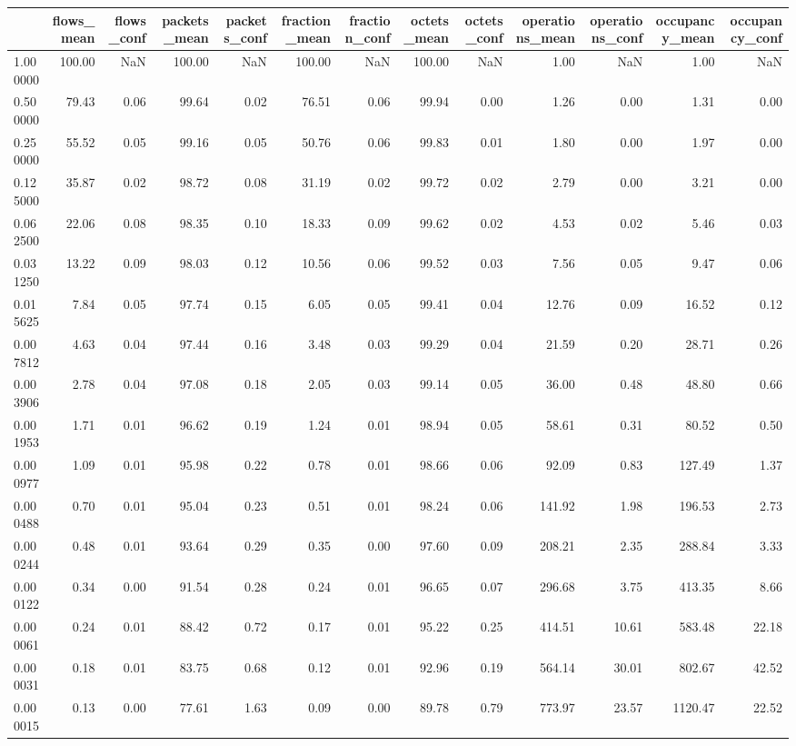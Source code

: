 \begin{tabular}{lrrrrrrrrrrrr}
\toprule
 & flows_mean & flows_conf & packets_mean & packets_conf & fraction_mean & fraction_conf & octets_mean & octets_conf & operations_mean & operations_conf & occupancy_mean & occupancy_conf \\
\midrule
1.000000 & 100.00 & NaN & 100.00 & NaN & 100.00 & NaN & 100.00 & NaN & 1.00 & NaN & 1.00 & NaN \\
0.500000 & 79.43 & 0.06 & 99.64 & 0.02 & 76.51 & 0.06 & 99.94 & 0.00 & 1.26 & 0.00 & 1.31 & 0.00 \\
0.250000 & 55.52 & 0.05 & 99.16 & 0.05 & 50.76 & 0.06 & 99.83 & 0.01 & 1.80 & 0.00 & 1.97 & 0.00 \\
0.125000 & 35.87 & 0.02 & 98.72 & 0.08 & 31.19 & 0.02 & 99.72 & 0.02 & 2.79 & 0.00 & 3.21 & 0.00 \\
0.062500 & 22.06 & 0.08 & 98.35 & 0.10 & 18.33 & 0.09 & 99.62 & 0.02 & 4.53 & 0.02 & 5.46 & 0.03 \\
0.031250 & 13.22 & 0.09 & 98.03 & 0.12 & 10.56 & 0.06 & 99.52 & 0.03 & 7.56 & 0.05 & 9.47 & 0.06 \\
0.015625 & 7.84 & 0.05 & 97.74 & 0.15 & 6.05 & 0.05 & 99.41 & 0.04 & 12.76 & 0.09 & 16.52 & 0.12 \\
0.007812 & 4.63 & 0.04 & 97.44 & 0.16 & 3.48 & 0.03 & 99.29 & 0.04 & 21.59 & 0.20 & 28.71 & 0.26 \\
0.003906 & 2.78 & 0.04 & 97.08 & 0.18 & 2.05 & 0.03 & 99.14 & 0.05 & 36.00 & 0.48 & 48.80 & 0.66 \\
0.001953 & 1.71 & 0.01 & 96.62 & 0.19 & 1.24 & 0.01 & 98.94 & 0.05 & 58.61 & 0.31 & 80.52 & 0.50 \\
0.000977 & 1.09 & 0.01 & 95.98 & 0.22 & 0.78 & 0.01 & 98.66 & 0.06 & 92.09 & 0.83 & 127.49 & 1.37 \\
0.000488 & 0.70 & 0.01 & 95.04 & 0.23 & 0.51 & 0.01 & 98.24 & 0.06 & 141.92 & 1.98 & 196.53 & 2.73 \\
0.000244 & 0.48 & 0.01 & 93.64 & 0.29 & 0.35 & 0.00 & 97.60 & 0.09 & 208.21 & 2.35 & 288.84 & 3.33 \\
0.000122 & 0.34 & 0.00 & 91.54 & 0.28 & 0.24 & 0.01 & 96.65 & 0.07 & 296.68 & 3.75 & 413.35 & 8.66 \\
0.000061 & 0.24 & 0.01 & 88.42 & 0.72 & 0.17 & 0.01 & 95.22 & 0.25 & 414.51 & 10.61 & 583.48 & 22.18 \\
0.000031 & 0.18 & 0.01 & 83.75 & 0.68 & 0.12 & 0.01 & 92.96 & 0.19 & 564.14 & 30.01 & 802.67 & 42.52 \\
0.000015 & 0.13 & 0.00 & 77.61 & 1.63 & 0.09 & 0.00 & 89.78 & 0.79 & 773.97 & 23.57 & 1120.47 & 22.52 \\

\end{tabular}
